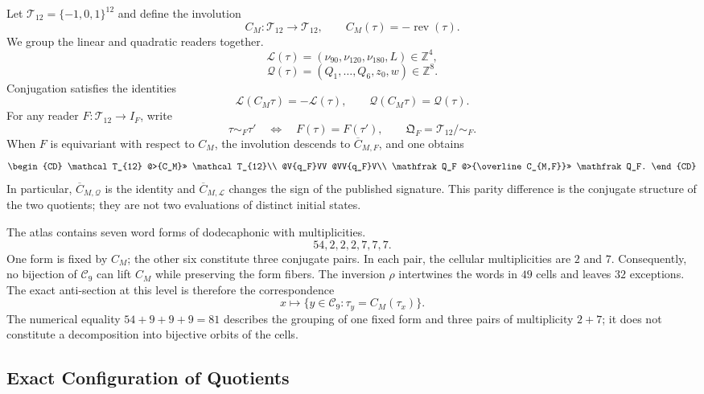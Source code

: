 Let \(\mathcal T_{12}=\{-1,0,1\}^{12}\) and define the involution
\[
 C_M:\mathcal T_{12}\longrightarrow\mathcal T_{12},
 \qquad C_M(\tau)=-\operatorname{rev}(\tau).
\]
We group the linear and quadratic readers together.
\[
 \mathcal L(\tau)=
 (\nu_{90},\nu_{120},\nu_{180},L)\in\mathbb Z^4,
\]
\[
 \mathcal Q(\tau)=
 (Q_1,\ldots,Q_6,z_0,w)\in\mathbb Z^8.
\]
Conjugation satisfies the identities
\begin{equation}
 \mathcal L(C_M\tau)=-\mathcal L(\tau),
 \qquad
 \mathcal Q(C_M\tau)=\mathcal Q(\tau).
 \label{eq:paridad-conjugacion-rev11}
\end{equation}
For any reader \(F:\mathcal T_{12}\to I_F\), write
\[
 \tau\sim_F\tau'\quad\Longleftrightarrow\quad F(\tau)=F(\tau'),
 \qquad
 \mathfrak Q_F=\mathcal T_{12}/\!\sim_F.
\]
When \(F\) is equivariant with respect to \(C_M\), the involution descends to
\(\overline C_{M,F}\), and one obtains
\[
\begin{CD}
 \mathcal T_{12} @>{C_M}>> \mathcal T_{12}\\
 @V{q_F}VV @VV{q_F}V\\
 \mathfrak Q_F @>{\overline C_{M,F}}>> \mathfrak Q_F.
\end{CD}
\]
In particular, \(\overline C_{M,\mathcal Q}\) is the identity and \(\overline C_{M,\mathcal L}\) changes the
sign of the published signature. This parity difference is the conjugate
structure of the two quotients; they are not two evaluations of distinct
initial states.

The atlas contains seven word forms of dodecaphonic with multiplicities.
\begin{equation}
 54,2,2,2,7,7,7.
 \label{eq:multiplicidades-formas-rev11}
\end{equation}
One form is fixed by \(C_M\); the other six constitute three
conjugate pairs. In each pair, the cellular multiplicities are \(2\) and \(7\).
Consequently, no bijection of \(\mathcal C_9\) can lift
\(C_M\) while preserving the form fibers. The inversion \(\rho\) intertwines the
words in \(49\) cells and leaves \(32\) exceptions. The exact anti-section
at this level is therefore the correspondence
\[
 x\longmapsto
 \{y\in\mathcal C_9:\tau_y=C_M(\tau_x)\}.
\]
The numerical equality \(54+9+9+9=81\) describes the grouping of one fixed
form and three pairs of multiplicity \(2+7\); it does not constitute a
decomposition into bijective orbits of the cells.

\subsection{Exact Configuration of Quotients}

